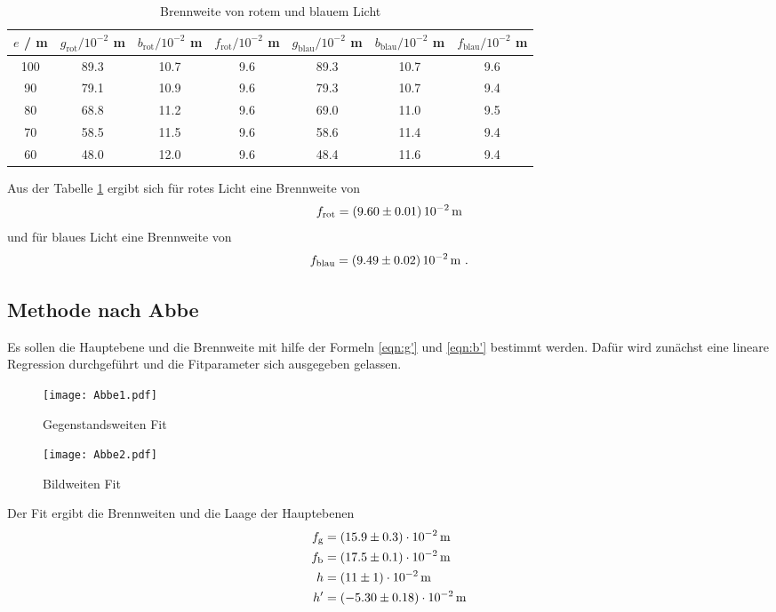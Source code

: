 \begin{table}
  \centering
  \begin{tabular}{c | c c c || c c c}
    \toprule
    $e$ / m & $g_\text{rot} / 10^{-2}$ m & $b_\text{rot} / 10^{-2}$ m & $f_\text{rot} / 10^{-2}$ m & $g_\text{blau} / 10^{-2}$ m & $b_\text{blau} / 10^{-2}$ m & $f_\text{blau} / 10^{-2}$ m \\
    \midrule
    100	& 89.3	& 10.7	& 9.6 &	89.3 & 10.7 & 9.6	\\
    90	& 79.1	& 10.9	& 9.6 & 79.3 & 10.7 & 9.4	\\
    80	& 68.8	& 11.2	& 9.6 & 69.0 & 11.0 & 9.5	\\
    70	& 58.5	& 11.5	& 9.6 & 58.6 & 11.4 & 9.4	\\
    60	& 48.0	& 12.0	& 9.6 & 48.4 & 11.6 & 9.4	\\
    \bottomrule
  \end{tabular}
  \caption{Brennweite von rotem und blauem Licht}
  \label{tab:fbesslf}
\end{table}
Aus der Tabelle \ref{tab:fbesslf} ergibt sich für rotes Licht eine Brennweite von
\begin{equation}
  f_\text{rot} = (\num{9.60 +- 0.01}) \, 10^{-2} \, \text{m}
  \label{eqn:frot}
\end{equation} 
und für blaues Licht eine Brennweite von 
\begin{equation}
  f_\text{blau} = (\num{9.49 +- 0.02}) \, 10^{-2} \, \text{m} \ .
  \label{fblau}
\end{equation}

\subsection{Methode nach Abbe}
Es sollen die Hauptebene und die Brennweite mit hilfe der Formeln \ref{eqn:g'} und \ref{eqn:b'} bestimmt werden. Dafür wird zunächst eine lineare Regression durchgeführt und die Fitparameter sich ausgegeben gelassen. 
\begin{figure}
  \centering
    \texttt{[image: Abbe1.pdf]}
  \caption{Gegenstandsweiten Fit}
  \label{fig:<+label+>}
\end{figure}
\begin{figure}
  \centering
  \texttt{[image: Abbe2.pdf]}
  \caption{Bildweiten Fit}
  \label{fig:<+label+>}
\end{figure}
Der Fit ergibt die Brennweiten und die Laage der Hauptebenen
\begin{eqnarray}
  f_\text{g} &= (\num{ 15.9 +- 0.3}) \cdot 10^{-2} \, \text{m} \\ 
  f_\text{b} &= (\num{ 17.5 +- 0.1 }) \cdot 10^{-2} \, \text{m} \\
  h &= (\num{ 11 +- 1}) \cdot 10^{-2} \, \text{m} \\
  h' &= (\num{ -5.3 +- 0.18}) \cdot 10^{-2} \,\text{m} 
  \label{eqn:abbedf}
\end{eqnarray}
